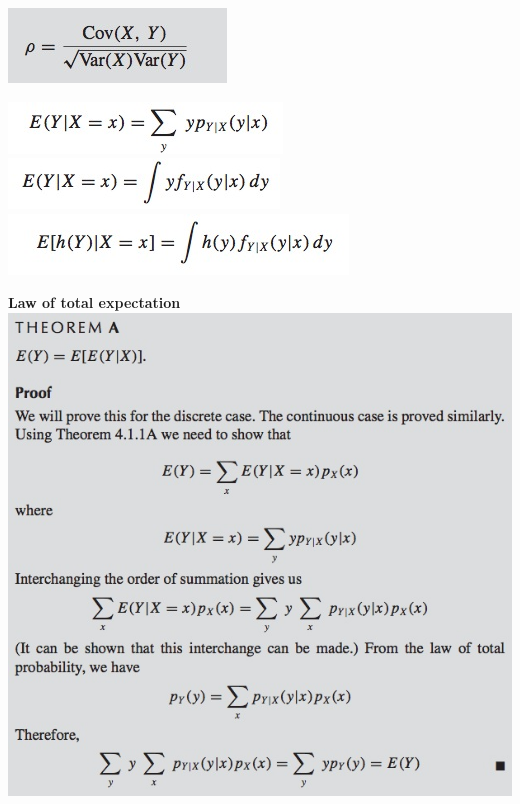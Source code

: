 \documentclass{examnotes}
\begin{document}
{

\includegraphics[scale=0.5]{./img/434.jpg}

\includegraphics[scale=0.5]{./img/441.jpg}
\includegraphics[scale=0.5]{./img/442.jpg}
\includegraphics[scale=0.5]{./img/443.jpg}


{\bf Law of total expectation}
\includegraphics[scale=0.5]{./img/44A.jpg}


}
\end{document}
